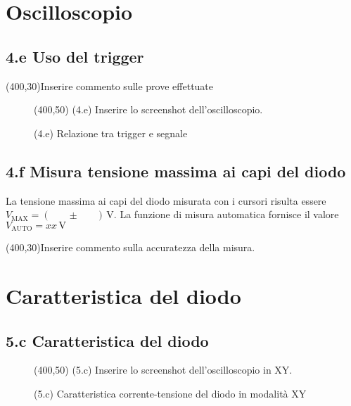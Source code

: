 \documentclass[10pt,a4paper]{article}
\newcommand{\exn}{\phantom{xxx}}
\begin{document}
\section{Oscilloscopio}

\subsection*{4.e Uso del trigger}

\exn 
\par
\vspace{0.5cm}
\framebox(400,30){Inserire commento sulle prove effettuate }

\begin{figure}[h]
\centering
\framebox(400,50){ (4.e) Inserire lo screenshot dell'oscilloscopio. }
\caption{(4.e) Relazione tra trigger e segnale}
\end{figure}


\subsection*{4.f Misura tensione massima ai capi del diodo}
\par 
La tensione massima ai capi del diodo misurata con i cursori risulta essere $V_{\mathrm{MAX}}= ( \exn \pm \exn ) \,\mathrm{V}$. La funzione di misura automatica fornisce il valore $V_{\mathrm{AUTO}}= xx \,\mathrm{V}$

\vspace{0.5cm} 
\framebox(400,30){Inserire commento sulla accuratezza della misura.}



\section{Caratteristica del diodo}
\par

\subsection*{5.c Caratteristica del diodo}

\begin{figure}[h]
\centering
\framebox(400,50){ (5.c) Inserire lo screenshot dell'oscilloscopio in XY. }
\caption{(5.c) Caratteristica corrente-tensione del diodo in modalit\`a XY}
\end{figure}
\end{document}
